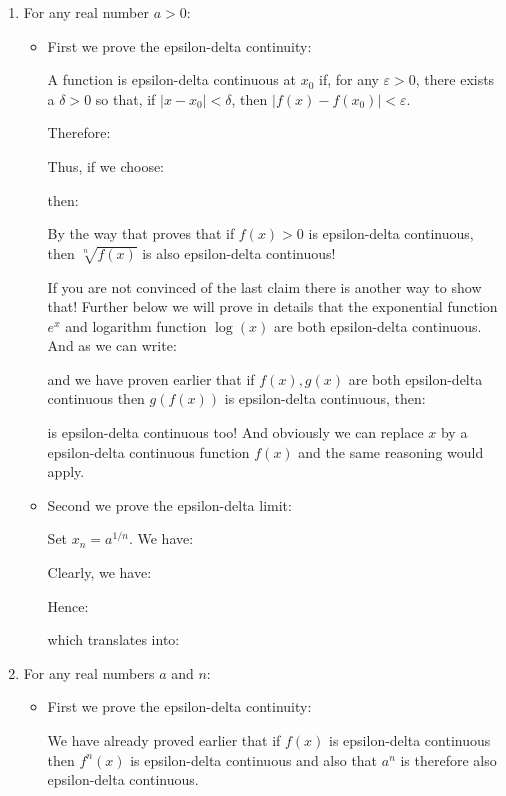 \begin{enumerate}
\begin{itemize}
		\end{itemize}
		
		\item For any real number $a>0$:
		
		
		
		\begin{itemize}
			\item First we prove the epsilon-delta continuity:
			
			A function is epsilon-delta continuous at $x_0$ if, for any $\varepsilon>0$, there exists a $\delta>0$ so that, if $|x-x_0|<\delta$, then $|f(x)-f(x_0)|<\varepsilon$.
			
			Therefore:
			
			Thus, if we choose: 
			
			then:
			
			By the way that proves that if $f(x)>0$ is epsilon-delta continuous, then $\sqrt[n]{f(x)}$ is also epsilon-delta continuous!
			
			If you are not convinced of the last claim there is another way to show that! Further below we will prove in details that the exponential function $e^x$ and logarithm function $\log(x)$ are both epsilon-delta continuous. And as we can write:
			
			and we have proven earlier that if $f(x),g(x)$ are both epsilon-delta continuous then $g(f(x))$ is epsilon-delta continuous, then:
			
			is epsilon-delta continuous too! And obviously we can replace $x$ by a epsilon-delta continuous function $f(x)$ and the same reasoning would apply.
			
			\item Second we prove the epsilon-delta limit:
			
			Set $x_n=a^{1 / n}$. We have:
			
			Clearly, we have:
			
			Hence:
			
			which translates into:
			
		\end{itemize}
		
		\item For any real numbers $a$ and $n$:
		

		\begin{itemize}
			\item First we prove the epsilon-delta continuity:
			
			We have already proved earlier that if $f(x)$ is epsilon-delta continuous then $f^n(x)$ is epsilon-delta continuous and also that $a^n$ is therefore also epsilon-delta continuous. 
			

\end{itemize}
\end{enumerate}
